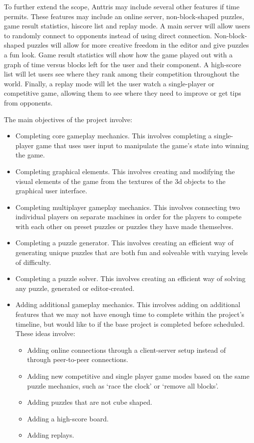 \documentclass[12pt]{article}
\begin{document}
To further extend the scope, Anttris may include several other features if time permits. These features may include an online server, non-block-shaped puzzles, game result statistics, hiscore list and replay mode. A main server will allow users to randomly connect to opponents instead of using direct connection. Non-block-shaped puzzles will allow for more creative freedom in the editor and give puzzles a fun look. Game result statistics will show how the game played out with a graph of time versus blocks left for the user and their component. A high-score list will let users see where they rank among their competition throughout the world. Finally, a replay mode will let the user watch a single-player or competitive game, allowing them to see where they need to improve or get tips from opponents.

The main objectives of the project involve:
\begin{itemize}
 \item Completing core gameplay mechanics. This involves completing a single-player game that uses user input to manipulate the game's state into winning the game.
 \item Completing graphical elements. This involves creating and modifying the visual elements of the game from the textures of the 3d objects to the graphical user interface.
 \item Completing multiplayer gameplay mechanics. This involves connecting two individual players on separate machines in order for the players to compete with each other on preset puzzles or puzzles they have made themselves.
 \item Completing a puzzle generator. This involves creating an efficient way of generating unique puzzles that are both fun and solveable with varying levels of difficulty.
 \item Completing a puzzle solver. This involves creating an efficient way of solving any puzzle, generated or editor-created.
 \item Adding additional gameplay mechanics. This involves adding on additional features that we may not have enough time to complete within the project's timeline, but would like to if the base project is completed before scheduled. These ideas involve:
  \begin{itemize}
  \item Adding online connections through a client-server setup instead of through peer-to-peer connections.
  \item Adding new competitive and single player game modes based on the same puzzle mechanics, such as `race the clock' or `remove all blocks'.
  \item Adding puzzles that are not cube shaped.
  \item Adding a high-score board.
  \item Adding replays.
  \end{itemize}
\end{itemize}
\end{document}
